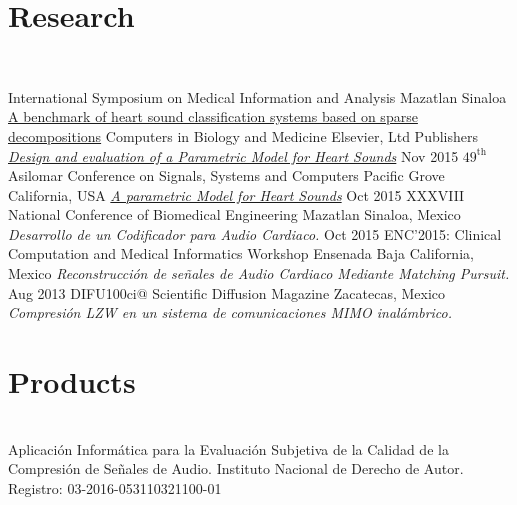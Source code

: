 \documentclass[letterpaper]{twentysecondcv} %
\begin{document}
\section{Research}\\
\begin{twenty}
    {International Symposium on Medical Information and Analysis}
    {\newline Mazatlan Sinaloa}
    {\href{https://hal.inria.fr/hal-01935058/}{A benchmark of heart sound classification systems based on sparse decompositions}}
    {Computers in Biology and Medicine}
    {\newline Elsevier, Ltd Publishers}
    {\href{https://www.sciencedirect.com/science/article/pii/S0010482517302603}{\emph{Design and evaluation of a Parametric Model for Heart Sounds}}}
	\twentyitem
    	{Nov 2015}
        {$\textrm{49}^{\text{th}}$ Asilomar Conference on Signals, Systems and Computers}
        {\newline Pacific Grove California, USA}
        {\href{https://ieeexplore.ieee.org/abstract/document/7421237} {\emph{A parametric Model for Heart Sounds}}}
        \twentyitem
    	{Oct 2015}
         {XXXVIII National Conference of Biomedical Engineering}
        {\newline Mazatlan Sinaloa, Mexico}
        {\emph{Desarrollo de un Codificador para Audio Cardiaco. }}
         \twentyitem
       {Oct 2015}
       {ENC'2015: Clinical Computation and Medical Informatics Workshop}
       {\newline Ensenada Baja California, Mexico}
       {\emph{Reconstrucci\'on de se\~nales de Audio Cardiaco Mediante Matching \mbox{Pursuit.}}
       }    
        \twentyitem 
       {Aug 2013}
       {DIFU100ci@ Scientific Diffusion Magazine}
        {Zacatecas, Mexico}        
        {\emph{Compresi\'on LZW en un sistema de comunicaciones MIMO inal\'ambrico.} }
\end{twenty}
\section{Products}
\\
{Aplicaci\'on Inform\'atica para la Evaluaci\'on Subjetiva de la Calidad de la Compresi\'on de Se\~nales de Audio. Instituto Nacional de Derecho de Autor. Registro: 03-2016-053110321100-01}
\end{document}
